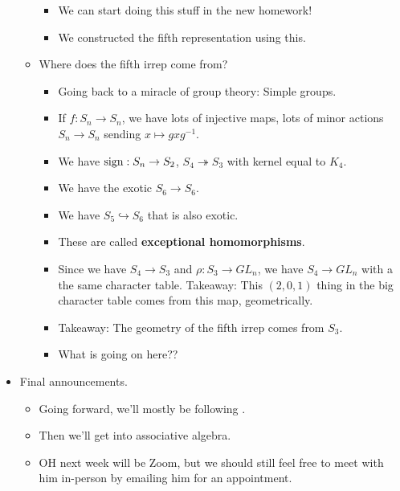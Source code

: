 \documentclass[../notes.tex]{subfiles}
\begin{document}
\begin{itemize}
\begin{itemize}
\begin{itemize}
            \item We can start doing this stuff in the new homework!
            \item We constructed the fifth representation using this.
        \end{itemize}
        \item Where does the fifth irrep come from?
        \begin{itemize}
            \item Going back to a miracle of group theory: Simple groups.
            \item If $f:S_n\to S_n$, we have lots of injective maps, lots of minor actions $S_n\to S_n$ sending $x\mapsto gxg^{-1}$.
            \item We have $\operatorname{sign}:S_n\to S_2$, $S_4\twoheadrightarrow S_3$ with kernel equal to $K_4$.
            \item We have the exotic $S_6\to S_6$.
            \item We have $S_5\hookrightarrow S_6$ that is also exotic.
            \item These are called \textbf{exceptional homomorphisms}.
            \item Since we have $S_4\to S_3$ and $\rho:S_3\to GL_n$, we have $S_4\to GL_n$ with a the same character table. Takeaway: This $(2,0,1)$ thing in the big character table comes from this map, geometrically.
            \item Takeaway: The geometry of the fifth irrep comes from $S_3$.
            \item What is going on here??
        \end{itemize}
    \end{itemize}
    \item Final announcements.
    \begin{itemize}
        \item Going forward, we'll mostly be following \textcite{bib:FultonHarris}.
        \item Then we'll get into associative algebra.
        \item OH next week will be Zoom, but we should still feel free to meet with him in-person by emailing him for an appointment.
    \end{itemize}
\end{itemize}
\end{document}
